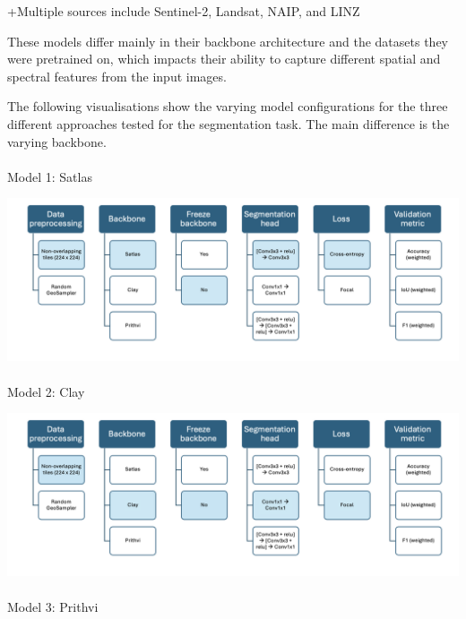 \documentclass[
  letterpaper,
  DIV=11,
  numbers=noendperiod]{scrartcl}
\makeatletter
\let\oldparagraph\paragraph
\renewcommand{\paragraph}{
    \@ifstar
      \xxxParagraphStar
      \xxxParagraphNoStar
  }
\newcommand{\xxxParagraphStar}[1]{\oldparagraph*{#1}\mbox{}}
\newcommand{\xxxParagraphNoStar}[1]{\oldparagraph{#1}\mbox{}}
\makeatother
\begin{document}
+Multiple sources include Sentinel-2, Landsat, NAIP, and LINZ

These models differ mainly in their backbone architecture and the
datasets they were pretrained on, which impacts their ability to capture
different spatial and spectral features from the input images.

The following visualisations show the varying model configurations for
the three different approaches tested for the segmentation task. The
main difference is the varying backbone.

\paragraph{Model 1: Satlas}\label{model-1-satlas}

\begin{center}
\includegraphics[width=6.25in,height=\textheight,keepaspectratio]{../figures/algo_design/satlas_model.png}
\end{center}

\paragraph{Model 2: Clay}\label{model-2-clay}

\begin{center}
\includegraphics[width=6.25in,height=\textheight,keepaspectratio]{../figures/algo_design/clay_model.png}
\end{center}

\paragraph{Model 3: Prithvi}\label{model-3-prithvi}
\end{document}
